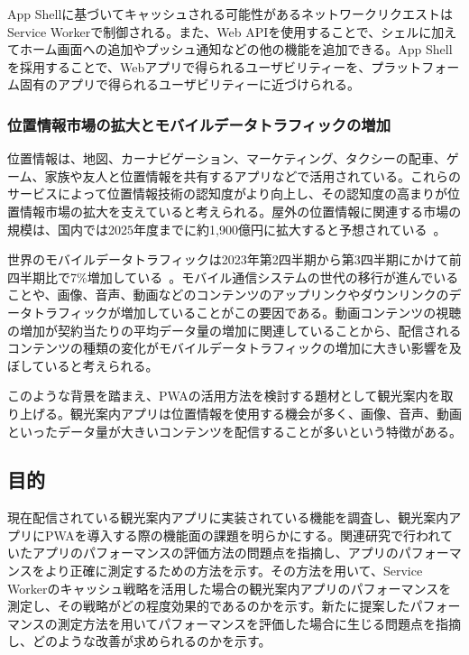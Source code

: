 App Shellに基づいてキャッシュされる可能性があるネットワークリクエストはService Workerで制御される。また、Web APIを使用することで、シェルに加えてホーム画面への追加やプッシュ通知などの他の機能を追加できる。App Shellを採用することで、Webアプリで得られるユーザビリティーを、プラットフォーム固有のアプリで得られるユーザビリティーに近づけられる。
\subsubsection{位置情報市場の拡大とモバイルデータトラフィックの増加}
\label{subsubsection:位置情報市場の拡大とモバイルデータトラフィックの増加}
位置情報は、地図、カーナビゲーション、マーケティング、タクシーの配車、ゲーム、家族や友人と位置情報を共有するアプリなどで活用されている。これらのサービスによって位置情報技術の認知度がより向上し、その認知度の高まりが位置情報市場の拡大を支えていると考えられる。屋外の位置情報に関連する市場の規模は、国内では2025年度までに約1,900億円に拡大すると予想されている~\cite{MIC2023InformationStatistics}。

世界のモバイルデータトラフィックは2023年第2四半期から第3四半期にかけて前四半期比で7\%増加している~\cite{EricssonNovember2023MobilityReportDataAndForecasts}。モバイル通信システムの世代の移行が進んでいることや、画像、音声、動画などのコンテンツのアップリンクやダウンリンクのデータトラフィックが増加していることがこの要因である。動画コンテンツの視聴の増加が契約当たりの平均データ量の増加に関連していることから、配信されるコンテンツの種類の変化がモバイルデータトラフィックの増加に大きい影響を及ぼしていると考えられる。

このような背景を踏まえ、PWAの活用方法を検討する題材として観光案内を取り上げる。観光案内アプリは位置情報を使用する機会が多く、画像、音声、動画といったデータ量が大きいコンテンツを配信することが多いという特徴がある。
\subsection{目的}
\label{subsection:目的}
現在配信されている観光案内アプリに実装されている機能を調査し、観光案内アプリにPWAを導入する際の機能面の課題を明らかにする。関連研究で行われていたアプリのパフォーマンスの評価方法の問題点を指摘し、アプリのパフォーマンスをより正確に測定するための方法を示す。その方法を用いて、Service Workerのキャッシュ戦略を活用した場合の観光案内アプリのパフォーマンスを測定し、その戦略がどの程度効果的であるのかを示す。新たに提案したパフォーマンスの測定方法を用いてパフォーマンスを評価した場合に生じる問題点を指摘し、どのような改善が求められるのかを示す。
